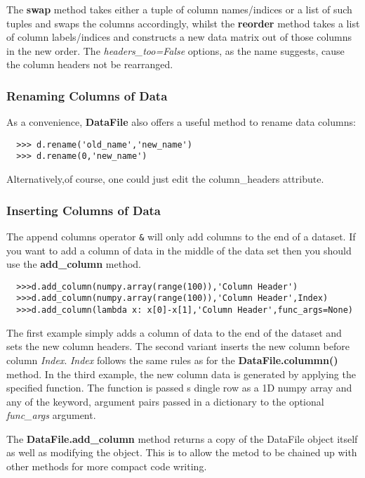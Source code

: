 \documentclass[a4paper,11pt]{scrartcl}
\begin{document}
The \textbf{swap} method takes either a tuple of column names/indices or a list of such tuples and swaps the columns accordingly, whilst the \textbf{reorder} method takes a list of column labels/indices and constructs a new data matrix out of those columns in the new order. The \textit{headers\_too=False} options, as the name suggests, cause the column headers not be rearranged.

\subsubsection{Renaming Columns of Data}
As a convenience, \textbf{DataFile} also offers a useful method to rename data columns:

\begin{verbatim}
  >>> d.rename('old_name','new_name')
  >>> d.rename(0,'new_name')
\end{verbatim}

Alternatively,of course, one could just edit the column\_headers attribute.

\subsubsection{Inserting Columns of Data}
The append columns operator \verb#&# will only add columns to the end of a
dataset. If you want to add a column of data in the middle of the data set then
you should use the \textbf{add\_column} method.

\begin{verbatim}
  >>>d.add_column(numpy.array(range(100)),'Column Header')
  >>>d.add_column(numpy.array(range(100)),'Column Header',Index)
  >>>d.add_column(lambda x: x[0]-x[1],'Column Header',func_args=None)
\end{verbatim}

The first example simply adds a column of data to the end of the dataset and
sets the new column headers. The second variant  inserts the new column before
column \textit{Index}. \textit{Index} follows the same rules as for the
\textbf{DataFile.colummn()} method. In the third example, the new column data is
generated by applying the specified function. The function is passed s dingle
row as a 1D numpy array and any of the keyword, argument pairs passed in a
dictionary to the optional \textit{func\_args} argument.

The \textbf{DataFile.add\_column} method returns a copy of the DataFile object
itself as well as modifying the object. This is to allow the metod to be chained
up with other methods for more compact code writing.
\end{document}
